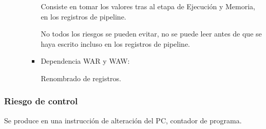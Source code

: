 \documentclass[12pt, twoside, openright]{report} %
\begin{document}
\begin{itemize}
\begin{itemize}
\begin{itemize}
          Consiste en tomar los valores tras al etapa de Ejecución y Memoria, en los registros de pipeline.

          No todos los riesgos se pueden evitar, no se puede leer antes de que se haya escrito incluso en los 
          registros de pipeline.

          \item Dependencia WAR y WAW:

          Renombrado de registros. 
        \end{itemize}
                
      \end{itemize}

    \end{itemize}
    
    \subsubsection{Riesgo de control} Se produce en una instrucción de alteración del PC, contador de programa.
\end{document}
